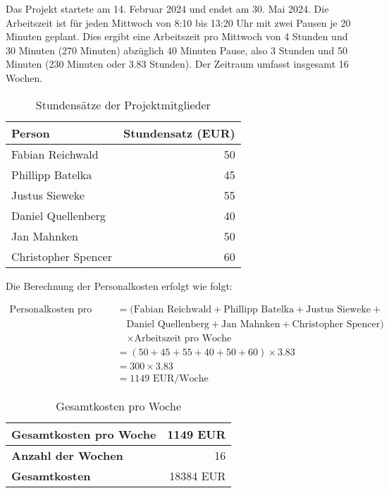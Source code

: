 Das Projekt startete am 14. Februar 2024 und endet am 30. Mai 2024. Die Arbeitszeit ist für jeden Mittwoch von 8:10 bis 13:20 Uhr mit zwei Pausen je 20 Minuten geplant. Dies ergibt eine Arbeitszeit pro Mittwoch von 4 Stunden und 30 Minuten (270 Minuten) abzüglich 40 Minuten Pause, also 3 Stunden und 50 Minuten (230 Minuten oder 3.83 Stunden). Der Zeitraum umfasst insgesamt 16 Wochen.

\begin{table}[ht]
  \centering
  \begin{tabular}{lr}
    \toprule
    \textbf{Person} & \textbf{Stundensatz (EUR)} \\
    \midrule
    Fabian Reichwald & 50 \\
    Phillipp Batelka & 45 \\
    Justus Sieweke & 55 \\
    Daniel Quellenberg & 40 \\
    Jan Mahnken & 50 \\
    Christopher Spencer & 60 \\
    \bottomrule
  \end{tabular}
  \caption{Stundensätze der Projektmitglieder}
\end{table}

Die Berechnung der Personalkosten erfolgt wie folgt:

\[
  \begin{aligned}
    \text{Personalkosten pro Woche} &= (\text{Fabian Reichwald} + \text{Phillipp Batelka} + \text{Justus Sieweke} + \\
    &\quad \text{Daniel Quellenberg} + \text{Jan Mahnken} + \text{Christopher Spencer}) \\
    &\quad \times \text{Arbeitszeit pro Woche} \\
    &= (50 + 45 + 55 + 40 + 50 + 60) \times 3.83 \\
    &= 300 \times 3.83 \\
    &= 1149 \text{ EUR/Woche}
  \end{aligned}
\]

\begin{table}[ht]
  \centering
  \begin{tabular}{lr}
    \toprule
    \textbf{Gesamtkosten pro Woche} & 1149 EUR \\
    \midrule
    \textbf{Anzahl der Wochen} & 16 \\
    \midrule
    \textbf{Gesamtkosten} & 18384 EUR \\
    \bottomrule
  \end{tabular}
  \caption{Gesamtkosten pro Woche}
\end{table}

